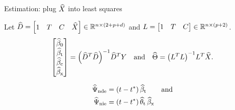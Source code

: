 \documentclass[aspectratio=169]{beamer}
\theoremstyle{remark}
\begin{document}
\begin{frame}{Estimation: plug $\widehat{X}$ into least squares}

    Let $\widehat{D} = \begin{bmatrix} 1 & T & C  & \widehat{X} \end{bmatrix} \in \mathbb{R}^{n \times (2 + p + d)}$ and $L = \begin{bmatrix} 1 & T & C \end{bmatrix} \in \mathbb{R}^{n \times (p + 2)}$.
    \begin{equation*}
        \begin{bmatrix}
            \betazerohat \\
            \betathat    \\
            \betachat    \\
            \betaxhat
        \end{bmatrix}
        = \paren*{\Dhat^T \Dhat}^{-1} \Dhat^T Y
        \quad \text{and} \quad
        \Thetahat
        = \paren*{\Wfull^T \Wfull}^{-1} \Wfull^T \Xhat.
    \end{equation*}

    \begin{align*}
        \ndehat & = \paren*{t - t^*} \, \betathat               & \text{and} \\
        \niehat & = \paren*{t - t^*} \, \thetathat \, \betaxhat
    \end{align*}
\end{frame}
\end{document}

